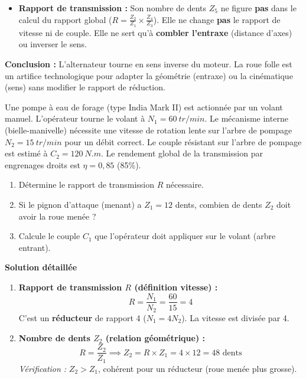 \documentclass[11pt]{article}
\begin{document}
\begin{exoresolu}
\begin{enumerate}
\begin{itemize}
                  \item \textbf{Rapport de transmission :} Son nombre de dents $Z_5$ ne figure \textbf{pas} dans le calcul du rapport global ($R = \frac{Z_2}{Z_1} \times \frac{Z_4}{Z_3}$). Elle ne change \textbf{pas} le rapport de vitesse ni de couple. Elle ne sert qu'à \textbf{combler l'entraxe} (distance d'axes) ou inverser le sens.
              \end{itemize}
    \end{enumerate}
    \textbf{Conclusion :} L'alternateur tourne en sens inverse du moteur. La roue folle est un artifice technologique pour adapter la géométrie (entraxe) ou la cinématique (sens) sans modifier le rapport de réduction.
\end{exoresolu}

\begin{exoresolu}
    Une pompe à eau de forage (type India Mark II) est actionnée par un volant manuel. L'opérateur tourne le volant à $N_1 = \SI{60}{tr/min}$. Le mécanisme interne (bielle-manivelle) nécessite une vitesse de rotation lente sur l'arbre de pompage $N_2 = \SI{15}{tr/min}$ pour un débit correct. Le couple résistant sur l'arbre de pompage est estimé à $C_2 = \SI{120}{N.m}$. Le rendement global de la transmission par engrenages droits est $\eta = 0,85$ (85\%).
    \begin{enumerate}
        \item Détermine le rapport de transmission $R$ nécessaire.
        \item Si le pignon d'attaque (menant) a $Z_1 = 12$ dents, combien de dents $Z_2$ doit avoir la roue menée ?
        \item Calcule le couple $C_1$ que l'opérateur doit appliquer sur le volant (arbre entrant).
    \end{enumerate}
    \tcblower
    \textbf{Solution détaillée}
    \begin{enumerate}
        \item \textbf{Rapport de transmission $R$ (définition vitesse) :}
              \[
              R = \frac{N_1}{N_2} = \frac{60}{15} = 4
              \]
              C'est un \textbf{réducteur} de rapport 4 ($N_1 = 4 N_2$). La vitesse est divisée par 4.
        \item \textbf{Nombre de dents $Z_2$ (relation géométrique) :}
              \[
              R = \frac{Z_2}{Z_1} \implies Z_2 = R \times Z_1 = 4 \times 12 = 48 \text{ dents}
              \]
              \emph{Vérification :} $Z_2 > Z_1$, cohérent pour un réducteur (roue menée plus grosse).

\end{enumerate}
\end{exoresolu}
\end{document}
